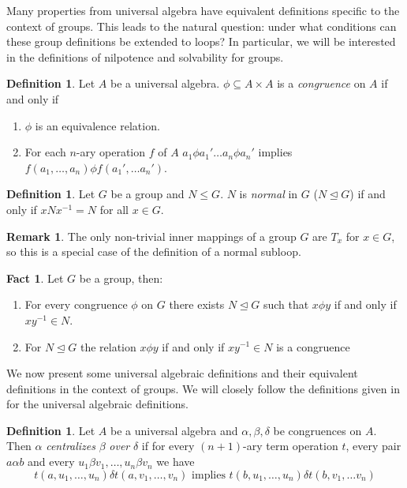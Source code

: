 \documentclass[12pt]{report}
\theoremstyle{definition}
\newtheorem{fct}[thm]{Fact}
\newtheorem{dfn}[thm]{Definition}
\newtheorem*{rmk}{Remark}
\begin{document}
Many properties from universal algebra have equivalent definitions specific to the context of groups.
  This leads to the natural question: under what conditions can these group definitions be extended
  to loops? In particular, we will be interested in the definitions of nilpotence and solvability
  for groups.

\begin{dfn}
  Let $A$ be a universal algebra. $\phi\subseteq A\times A$ is a \emph{congruence} on $A$ if and only if
  \begin{enumerate}
    \item $\phi$ is an equivalence relation.
    \item For each $n$-ary operation $f$ of $A$ $a_1 \phi a_1'\ldots a_n\phi a_n'$ implies
      $f(a_1, \ldots, a_n)\phi f(a_1', \ldots a_n')$.
  \end{enumerate}
\end{dfn}

\begin{dfn}
  Let $G$ be a group and $N\leq G$. $N$ is \emph{normal} in $G$ ($N\unlhd G$) if and
    only if $xNx^{-1} = N$ for all $x\in G$.
\end{dfn}

\begin{rmk}
  The only non-trivial inner mappings of a group $G$ are $T_x$ for $x\in G$, so this is a
    special case of the definition of a normal subloop.
\end{rmk}

\begin{fct}
  Let $G$ be a group, then:
  \begin{enumerate}
    \item For every congruence $\phi$ on $G$ there exists $N\unlhd G$ such that
      $x\phi y$ if and only if $xy^{-1}\in N$.
    \item For $N\unlhd G$ the relation $x\phi y$ if and only if $xy^{-1}\in N$ is a congruence \cite{univAlg} 
  \end{enumerate}
\end{fct}

We now present some universal algebraic definitions and their equivalent definitions in the context of
  groups. We will closely follow the definitions given in \cite{ComTheory} for the universal
  algebraic definitions.

\begin{dfn}
  Let $A$ be a universal algebra and $\alpha, \beta, \delta$ be congruences on $A$. Then
    $\alpha$ \emph{centralizes} $\beta$ \emph{over} $\delta$ if for every $(n + 1)$-ary term
    operation $t$, every pair $a\alpha b$ and every $u_1\beta v_1, \ldots, u_n \beta v_n$ we have
  \[t(a, u_1, \ldots, u_n) \delta t(a, v_1, \ldots, v_n)\text{ implies } t(b, u_1, \ldots, u_n)\delta t(b, v_1, \ldots v_n)\]
\end{dfn}
\end{document}
